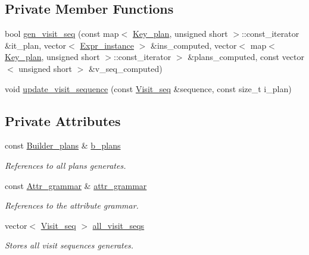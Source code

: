 \subsection*{Private Member Functions}
\begin{CompactItemize}
\item 
bool \hyperlink{classgenevalmag_1_1Builder__visit__sequences_81498899f7859f929abb96526f20e4a3}{gen\_\-visit\_\-seq} (const map$<$ \hyperlink{structgenevalmag_1_1k__plan}{Key\_\-plan}, unsigned short $>$::const\_\-iterator \&it\_\-plan, vector$<$ \hyperlink{classgenevalmag_1_1Expr__instance}{Expr\_\-instance} $>$ \&ins\_\-computed, vector$<$ map$<$ \hyperlink{structgenevalmag_1_1k__plan}{Key\_\-plan}, unsigned short $>$::const\_\-iterator $>$ \&plans\_\-computed, const vector$<$ unsigned short $>$ \&v\_\-seq\_\-computed)
\item 
void \hyperlink{classgenevalmag_1_1Builder__visit__sequences_eb3f3076ab75a8869785d98c0c3bcdf2}{update\_\-visit\_\-sequence} (const \hyperlink{namespacegenevalmag_7720677d79b33ecca4db21cdbcf7908f}{Visit\_\-seq} \&sequence, const size\_\-t i\_\-plan)
\end{CompactItemize}
\subsection*{Private Attributes}
\begin{CompactItemize}
\item 
const \hyperlink{classgenevalmag_1_1Builder__plans}{Builder\_\-plans} \& \hyperlink{classgenevalmag_1_1Builder__visit__sequences_ccdb8c83f0540acd32f2ee461c9b2fbe}{b\_\-plans}
\begin{CompactList}\small\item\em References to all plans generates. \item\end{CompactList}\item 
const \hyperlink{classgenevalmag_1_1Attr__grammar}{Attr\_\-grammar} \& \hyperlink{classgenevalmag_1_1Builder__visit__sequences_2eb7705741cd581ed968e0bc6127b3fd}{attr\_\-grammar}
\begin{CompactList}\small\item\em References to the attribute grammar. \item\end{CompactList}\item 
vector$<$ \hyperlink{namespacegenevalmag_7720677d79b33ecca4db21cdbcf7908f}{Visit\_\-seq} $>$ \hyperlink{classgenevalmag_1_1Builder__visit__sequences_ba229b62df85d994ce9a5da960c1273a}{all\_\-visit\_\-seqs}
\begin{CompactList}\small\item\em Stores all visit sequences generates. \item\end{CompactList}\end{CompactItemize}


